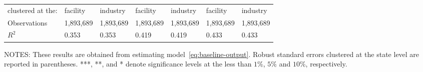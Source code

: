 \begin{table}[H]
{\begin{tabular}{@{}lllllll@{}}
            clustered at the: & facility  & industry  & facility  & industry  & facility  & industry  \\
            Observations      & 1,893,689 & 1,893,689 & 1,893,689 & 1,893,689 & 1,893,689 & 1,893,689 \\
            $R^2$             & 0.353     & 0.353     & 0.419     & 0.419     & 0.433     & 0.433     \\ \bottomrule \bottomrule
        \end{tabular}%
    }
    \begin{minipage}{\columnwidth}
        \vspace{0.05in}
        \tiny NOTES: These results are obtained from estimating model~\ref{eq:baseline-output}. Robust standard errors clustered at the state level are reported in parentheses. ***, **, and * denote significance levels at the less than $1\%$, $5\%$ and $10\%$, respectively.
    \end{minipage}
\end{table}